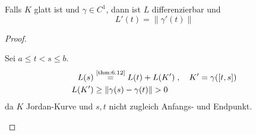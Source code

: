 \begin{theorem}[Hilfssatz]
\begin{enum-arab}
    \item Falls $K$ glatt ist und $\gamma \in C^1$, dann ist $L$ differenzierbar und \[L'(t) = \|\gamma'(t)\|\]
  \end{enum-arab}
  
  \begin{proof}
    \begin{enum-arab}
      \item \label{itm:6.14 1)} Sei $a \leq t < s \leq b$.
      \begin{align*}
        L(s) &\overset{\text{\ref{thm:6.12}}}{=} L(t) + L(K') \; , \quad K' = \gamma([t,s]) \\
        L(K') &\geq \|\gamma(s) - \gamma(t)\| > 0
      \end{align*}
      da $K$ Jordan-Kurve und $s,t$ nicht zugleich Anfangs- und Endpunkt.
      

\end{enum-arab}
\end{proof}
\end{theorem}
